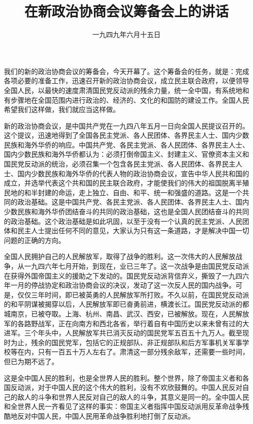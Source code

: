 
\title{在新政治协商会议筹备会上的讲话}
\date{一九四九年六月十五日}
\maketitle



我们的新的政治协商会议的筹备会，今天开幕了。这个筹备会的任务，就是：完成各项必要的准备工作，迅速召开新的政治协商会议，成立民主联合政府，以便领导全国人民，以最快的速度肃清国民党反动派的残余力量，统一全中国，有系统地和有步骤地在全国范围内进行政治的、经济的、文化的和国防的建设工作。全国人民希望我们这样做，我们就应当这样做。

新的政治协商会议，是中国共产党在一九四八年五月一日向全国人民提议召开的。这个提议，迅速地得到了全国各民主党派、各人民团体、各界民主人士、国内少数民族和海外华侨的响应。中国共产党、各民主党派、各人民团体、各界民主人士、国内少数民族和海外华侨都认为：必须打倒帝国主义、封建主义、官僚资本主义和国民党反动派的统治，必须召集一个包含各民主党派、各人民团体、各界民主人士、国内少数民族和海外华侨的代表人物的政治协商会议，宣告中华人民共和国的成立，并选举代表这个共和国的民主联合政府，才能使我们的伟大的祖国脱离半殖民地的和半封建的命运，走上独立、自由、和平、统一和强盛的道路。这是一个共同的政治基础。这是中国共产党、各民主党派、各人民团体、各界民主人士、国内少数民族和海外华侨团结奋斗的共同的政治基础，这也是全国人民团结奋斗的共同的政治基础。这个政治基础是如此巩固，以至于没有一个认真的民主党派、人民团体和民主人士提出任何不同的意见，大家认为只有这一条道路，才是解决中国一切问题的正确的方向。

全国人民拥护自己的人民解放军，取得了战争的胜利。这一次伟大的人民解放战争，从一九四六年七月开始，到现在，业已三年了。这一次战争是由国民党反动派在获得外国帝国主义的援助之下发动的。国民党反动派背信弃义，撕毁了一九四六年一月的停战协定和政治协商会议的决议，发动了这一次反人民的国内战争。可是，仅仅三年时间，即已被英勇的人民解放军所打败。不久以前，在国民党反动派的和平阴谋被揭穿以后，人民解放军即已奋勇前进，横渡长江。国民党反动派的都城南京，已被夺取。上海、杭州、南昌、武汉、西安，已被解放。现在，人民解放军的各路野战军，正在向南方和西北各省，举行着自有中国历史以来未曾有过的大进军。三个年头中，人民解放军共已消灭反动的国民党军五百五十九万人。截至现时为止，残余的国民党军，包括它的正规部队、非正规部队和后方军事机关军事学校等在内，只有一百五十万人左右了。肃清这一部分残余敌军，还需要一些时间，但已为期不远了。

这是全中国人民的胜利，也是全世界人民的胜利。整个世界，除了帝国主义者和各国反动派，对于中国人民的这个伟大的胜利，没有不欢欣鼓舞的。中国人民反对自己的敌人的斗争和世界人民反对自己的敌人的斗争，其意义是同一的。全中国人民和全世界人民一齐看见了这样的事实：帝国主义者指挥中国反动派用反革命战争残酷地反对中国人民，中国人民用革命战争胜利地打倒了反动派。

